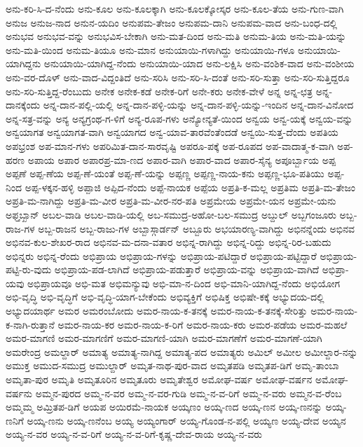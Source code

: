 {ಅನು-ಕರಿ-ಸಿ-ದ-ನೆಂದು
ಅನು-ಕೂಲ
ಅನು-ಕೂಲಕ್ಕಾಗಿ
ಅನು-ಕೂಲಕ್ಕೋಸ್ಕರ
ಅನು-ಕೂಲ-ತೆಯ
ಅನು-ಗುಣ-ವಾಗಿ
ಅನುಜ
ಅನುಜ-ನಾದ
ಅನುನ-ಯದಿಂ
ಅನುಪಮ-ತೇಜಂ
ಅನುಪಮ-ದಾನಿ
ಅನುಪಮ-ವಾದ
ಅನು-ಬಂಧ-ದಲ್ಲಿ
ಅನುಭವ
ಅನುಭವ-ವನ್ನು
ಅನುಭವಿಸ-ಬೇಕಾಗಿ
ಅನು-ಮತ-ದಿಂದ
ಅನು-ಮತಿ
ಅನುಮ-ತಿಯ
ಅನು-ಮತಿ-ಯನ್ನು
ಅನು-ಮತಿ-ಯಿಂದ
ಅನುಮ-ತಿಯೂ
ಅನು-ಮಾನ
ಅನುಯಾಯಿ-ಗಳಾಗಿದ್ದು
ಅನುಯಾಯಿ-ಗಳೂ
ಅನುಯಾಯಿ-ಯಾಗಿದ್ದನು
ಅನುಯಾಯಿ-ಯಾಗಿದ್ದ-ನೆಂದು
ಅನುಯಾಯಿ-ಯಾದ
ಅನು-ಲಕ್ಷಿಸಿ
ಅನು-ವಂಶಿಕ-ವಾದ
ಅನು-ವಂಶೀಯ
ಅನು-ವರ-ದೊಳ್
ಅನು-ವಾದ-ವಿದ್ದಂತಿದೆ
ಅನು-ಸರಿಸಿ
ಅನು-ಸರಿ-ಸಿ-ದಂತೆ
ಅನು-ಸರಿ-ಸುತ್ತಾ
ಅನು-ಸರಿ-ಸುತ್ತಿದ್ದರೂ
ಅನು-ಸರಿ-ಸುತ್ತಿದ್ದ-ರೆಂಬುದು
ಅನೇಕ
ಅನೇಕ-ಕಡೆ
ಅನೇಕ-ರಿಗೆ
ಅನೇ-ಕರು
ಅನೇಕ-ವೇಳೆ
ಅನ್ನ
ಅನ್ನ-ಛತ್ರ
ಅನ್ನ-ದಾನಕ್ಕೆಂದು
ಅನ್ನ-ದಾನ-ಪಲ್ಲಿ-ಯಲ್ಲಿ
ಅನ್ನ-ದಾನ-ಪಳ್ಳಿ-ಯನ್ನು
ಅನ್ನ-ದಾನ-ಪಳ್ಳಿ-ಯನ್ನು-ಇಂದಿನ
ಅನ್ನ-ದಾನ-ವಿನೋದ
ಅನ್ನ-ಸತ್ರ-ವನ್ನು
ಅನ್ಯ
ಅನ್ಯಗ್ರಂಥ-ಗ-ಳಿಗೆ
ಅನ್ಯ-ರೂಪ-ಗಳು
ಅನ್ಯೋನ್ಯತೆ-ಯಿಂದ
ಅನ್ವಯ
ಅನ್ವ-ಯಕ್ಕೆ
ಅನ್ವಯ-ವನ್ನು
ಅನ್ವಯಾಗತ
ಅನ್ವಯಾಗತ-ವಾಗಿ
ಅನ್ವಯಾಗದ
ಅನ್ವ-ಯಾವ-ತಾರವೆಂತೆಂದಡೆ
ಅನ್ವಯಿ-ಸುತ್ತ-ದೆಂದು
ಅಪತಿಯ
ಅಪಭ್ರಂಶ
ಅಪ-ಮಾನ-ಗಳು
ಅಪರಿಮಿತ-ದಾನ-ಸಾರವೃಷ್ಟಿ
ಅಪರೂ-ಪಕ್ಕೆ
ಅಪ-ರೂಪದ
ಅಪ-ವಾದಾತ್ಮ-ಕ-ವಾಗಿ
ಅಪ-ಹರಣ
ಅಪಾಯ
ಅಪಾರ
ಅಪಾರಪ್ರ-ಮಾ-ಣದ
ಅಪಾರ-ವಾಗಿ
ಅಪಾರ-ವಾದ
ಅಪಾರ-ಸೈನ್ಯ
ಅಪೂರ್ಬ್ಬಾಯ
ಅಪ್ಪ
ಅಪ್ಪಣೆ
ಅಪ್ಪ-ಣೆಯ
ಅಪ್ಪ-ಣೆ-ಯಂತೆ
ಅಪ್ಪ-ಣೆ-ಯನ್ನು
ಅಪ್ಪಣ್ಣ
ಅಪ್ಪಣ್ಣ-ನಾಯ-ಕನು
ಅಪ್ಪಣ್ಣ-ಭೂ-ಪತಿಯು
ಅಪ್ಪ-ನಿಂದ
ಅಪ್ಪ-ಳಕ್ಕನ-ಹಳ್ಳಿ
ಅಪ್ಪಾಜಿ
ಅಪ್ಪಿದ-ನೆಂದು
ಅಪ್ಪೆ-ನಾಯಕ
ಅಪ್ಪೆಯ
ಅಪ್ರತಿ-ಕ-ಮಲ್ಲ
ಅಪ್ರತಿಮ
ಅಪ್ರತಿ-ಮ-ತೇಜಂ
ಅಪ್ರತಿ-ಮ-ನಾಗಿದ್ದು
ಅಪ್ರತಿ-ಮ-ವೀರ
ಅಪ್ರತಿ-ಮ-ವೀರ-ನರ-ಪತಿ
ಅಪ್ರಮೇಯ
ಅಪ್ರಮೇ-ಯನ
ಅಪ್ರಮೇ-ಯನು
ಅಫ್ತಬ್ಖಾನ್
ಅಬಲ-ವಾಡಿ
ಅಬಲ-ವಾಡಿ-ಯಲ್ಲಿ
ಅಬ-ಸಮುದ್ರ-ಅಹೋ-ಬಲ-ಸಮುದ್ರ
ಅಬ್ದುಲ್
ಅಬ್ಬಗಂಜೂರು
ಅಬ್ಬ-ರಾಜ-ಗಳ
ಅಬ್ಬ-ರಾಜನ
ಅಬ್ಬ-ರಾಜು-ಗಳ
ಅಬ್ಬಾಸ್ಗಾರ್ಡನ್
ಅಬ್ಬೂರು
ಅಭಯಾರಣ್ಯ-ವಾಗಿದ್ದು
ಅಭಿನನ್ನೆಂದು
ಅಭಿನವ
ಅಭಿನವ-ಕುಲ-ಶೇಖರ-ರಾದ
ಅಭಿನವ-ಮ-ದನಾ-ವತಾರ
ಅಭಿನ್ನ-ರಾಗಿದ್ದು
ಅಭಿನ್ನ-ರಿದ್ದು
ಅಭಿನ್ನ-ರಿರ-ಬಹುದು
ಅಭಿನ್ನರು
ಅಭಿನ್ನ-ರೆಂದು
ಅಭಿಪ್ರಾಯ
ಅಭಿಪ್ರಾಯ-ಗಳನ್ನು
ಅಭಿಪ್ರಾಯ-ಪಟಿದ್ದಾರೆ
ಅಭಿಪ್ರಾಯ-ಪಟ್ಟಿದ್ದಾರೆ
ಅಭಿಪ್ರಾಯ-ಪಟ್ಟಿ-ರು-ವುದು
ಅಭಿಪ್ರಾಯ-ಪಡ-ಲಾಗಿದೆ
ಅಭಿಪ್ರಾಯ-ಪಡುತ್ತಾರೆ
ಅಭಿಪ್ರಾಯ-ವನ್ನು
ಅಭಿಪ್ರಾಯ-ವಾಗಿದೆ
ಅಭಿಪ್ರಾ-ಯವು
ಅಭಿಪ್ರಾಯವೂ
ಅಭಿ-ಮತ
ಅಭಿಮನ್ಯುವು
ಅಭಿ-ಮಾ-ನ-ದಿಂದ
ಅಭಿ-ಮಾನಿ-ಯಾಗಿದ್ದ-ನೆಂದು
ಅಭಿಯೋಗ
ಅಭಿ-ವೃದ್ಧಿ
ಅಭಿ-ವೃದ್ಧಿಗೆ
ಅಭಿ-ವೃದ್ಧಿ-ಯಾಗ-ಬೇಕೆಂದು
ಅಭಿವ್ಯಕ್ತಿಗೆ
ಅಭಿಷಿಕ್ತ
ಅಭಿಷೇ-ಕಕ್ಕೆ
ಅಭ್ಯುದಯ-ದಲ್ಲಿ
ಅಭ್ಯುದಯಾರ್ಥ
ಅಮರ
ಅಮರಂಬೋದು
ಅಮರ-ನಾಯ-ಕ-ತನಕ್ಕೆ
ಅಮರ-ನಾಯ-ಕ-ತನಕ್ಕೆ-ಸೇರಿತ್ತು
ಅಮರ-ನಾಯ-ಕ-ನಾಗಿ-ರುತ್ತಾನೆ
ಅಮರ-ನಾಯ-ಕರ
ಅಮರ-ನಾಯ-ಕ-ರಿಗೆ
ಅಮರ-ನಾಯ-ಕರು
ಅಮರ-ಪಡೆಯ
ಅಮರ-ಮಹಲೆ
ಅಮರ-ಮಾಗಣಿ
ಅಮರ-ಮಾಗಣಿಗೆ
ಅಮರ-ಮಾಗಣಿ-ಯಾಗಿ
ಅಮರ-ಮಾಗಣೆಗೆ
ಅಮರ-ಮಾಗಣೆ-ಯಾಗಿ
ಅಮರೇಂದ್ರ
ಅಮಲ್ದಾರ್
ಅಮಾತ್ಯ
ಅಮಾತ್ಯ-ನಾಗಿದ್ದ
ಅಮಾತ್ಯ-ಪದ
ಅಮಾತ್ಯರು
ಅಮಿಲ್
ಅಮೀಲ
ಅಮೀಲ್ದಾರ-ನನ್ನು
ಅಮುಕ್ತ
ಅಮುದ-ಸಮುದ್ರ
ಅಮುಲ್ದಾರ್
ಅಮೃತ-ನಾಥ-ಪುರ-ವಾದ
ಅಮೃತಪಡಿ
ಅಮೃತಪ-ಡಿಗೆ
ಅಮೃ-ತಾಂಬಾ
ಅಮೃತಾ-ಪುರ
ಅಮೃತಿ
ಅಮೃತೂರಿನ
ಅಮೃತೂರು
ಅಮೃತೇಶ್ವರ
ಅಮೋಘ-ವರ್ಷ
ಅಮೋಘ-ವರ್ಷನ
ಅಮೋಘ-ವರ್ಷನು
ಅಮ್ಮನ-ಪುರದ
ಅಮ್ಮ-ನ-ವರ
ಅಮ್ಮ-ನ-ವರ-ಗುಡಿ
ಅಮ್ಮ-ನ-ವ-ರಿಗೆ
ಅಮ್ಮ-ನ-ವರು
ಅಮ್ಮನ-ವ-ರೆಂಬ
ಅಮ್ಮಮ್ಮ
ಅಮ್ರಿತಪ-ಡಿಗೆ
ಅಯಪ
ಅಯಿರಮೆ-ನಾಯಕ
ಅಯ್ಕಣಂ
ಅಯ್ಕ-ಣದ
ಅಯ್ಕ-ಣನ
ಅಯ್ಕ-ಣನನ್ನು
ಅಯ್ಕ-ಣನಿಗೆ
ಅಯ್ಕ-ಣನು
ಅಯ್ಕ-ಣನೆಂಬ
ಅಯ್ಯ
ಅಯ್ಯಂಗಾರ್
ಅಯ್ಯ-ಗೊಂಡ-ನ-ಪಲ್ಲಿ
ಅಯ್ಯಣ
ಅಯ್ಯ-ದೇವ
ಅಯ್ಯನ
ಅಯ್ಯ-ನ-ವರ
ಅಯ್ಯ-ನ-ವ-ರಿಗೆ
ಅಯ್ಯ-ನ-ವ-ರಿಗೆ-ಕೃಷ್ಣ-ದೇವ-ರಾಯ
ಅಯ್ಯ-ನ-ವರು
}
